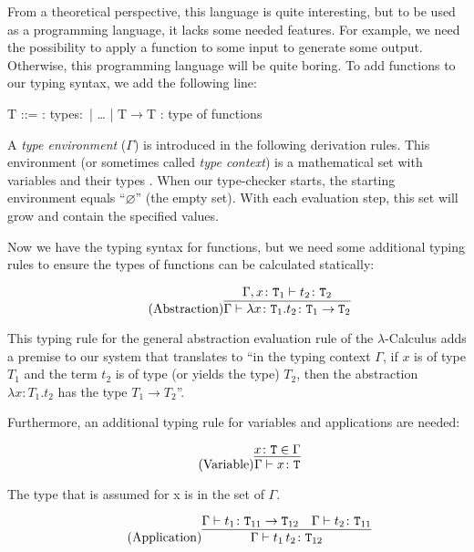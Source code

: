 From a theoretical perspective, this language is quite interesting, but to be used
as a programming language, it lacks some needed features. For example, we need the
possibility to apply a function to some input to generate some output. Otherwise,
this programming language will be quite boring. To add functions to our typing
syntax, we add the following line:

\begin{bnfgrammar}
    T ::= : types$\colon$
    | \dots
    | T$\rightarrow$T : type of functions
\end{bnfgrammar}

A \textit{type environment} ($\Gamma$) is introduced in the following derivation rules.
This environment (or sometimes called \textit{type context}) is
a mathematical set with variables and their types \cite{pierce2002ProgLang}.
When our type-checker starts, the starting environment equals
``$\varnothing$'' (the empty set). With each evaluation step, this set will grow
and contain the specified values.

Now we have the typing syntax for functions, but we need some additional typing
rules to ensure the types of functions can be calculated statically:

\begin{equation*}
    \tag{Abstraction}
    \infer{
        \Gamma \vdash \lambda x \colon \texttt{T}_1 . t_2 \colon \texttt{T}_1 \rightarrow \texttt{T}_2
    }{
        \Gamma,x \colon \texttt{T}_1 \vdash t_2 \colon \texttt{T}_2
    }
\end{equation*}

This typing rule for the general abstraction evaluation rule
of the $\lambda$-Calculus adds
a premise to our system that translates to ``in the typing context $\Gamma$,
if $x$ is of type $T_1$ and the term $t_2$ is of type (or yields the type) $T_2$,
then the abstraction $\lambda x \colon T_1 . t_2$ has the type $T_1 \rightarrow T_2$''.

Furthermore, an additional typing rule for variables and applications
are needed:

\begin{equation*}
    \tag{Variable}
    \infer{
        \Gamma \vdash x \colon \texttt{T}
    }{
        x \colon \texttt{T} \in \Gamma
    }
\end{equation*}

The type that is assumed for x is in the set of $\Gamma$.

\begin{equation*}
    \tag{Application}
    \infer{
        \Gamma \vdash t_1\,t_2 \colon \texttt{T}_{12}
    }{
        \Gamma \vdash t_1 \colon \texttt{T}_{11} \rightarrow \texttt{T}_{12}
        &
        \Gamma \vdash t_2 \colon \texttt{T}_{11}
    }
\end{equation*}

